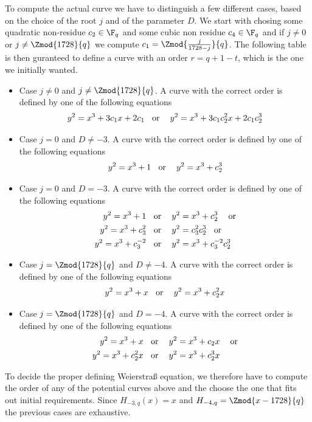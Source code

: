 To compute the actual curve we have to distinguish a few different cases, based on the choice of the root $j$ and of the parameter $D$. We start with chosing some quadratic non-residue $c_2\in \F_q$ and some cubic non residue $c_4\in \F_q$ and if $j\neq 0$ or $j\neq \Zmod{1728}{q}$ we compute $c_1=\Zmod{\frac{j}{1728 -j}}{q}$. The following table is then guranteed to define a curve with an order $r= q+1 -t$, which is the one we initially wanted.
\begin{itemize}
\item Case $j \neq 0 $ and $j\neq \Zmod{1728}{q}$. A curve with the correct order is defined by one of the following equations 
\begin{equation}
y^2 = x^3 + 3c_1x + 2c_1 \text{\;\; or \;\; } y^2 = x^3 + 3c_1c_2^2x + 2c_1c_2^3
\end{equation}
\item Case $j = 0 $ and $D\neq -3$. A curve with the correct order is defined by one of the following equations 
\begin{equation}
y^2 = x^3 + 1 \text{\;\; or \;\; } y^2 = x^3 + c_2^3
\end{equation}
\item Case $j = 0 $ and $D= -3$. A curve with the correct order is defined by one of the following equations 
\begin{align*}
y^2 = x^3 +1 & \text{\;\; or \;\; } y^2 = x^3 + c_2^3 \text{ \;\; or}\\  
y^2 = x^3 + c_3^2 & \text{\;\; or \;\; } y^2 = c_3^2 c_2^3 \text{\;\; or}\\
y^2 = x^3 + c_3^{-2} & \text{\;\; or \;\; }  y^2 = x^3 + c_3^{-2}c_2^3 
\end{align*}
\item Case $j = \Zmod{1728}{q} $ and $D\neq -4$. A curve with the correct order is defined by one of the following equations 
\begin{equation}
y^2 = x^3 + x \text{\;\; or \;\; } y^2 = x^3 + c_2^2x
\end{equation}
\item Case $j = \Zmod{1728}{q} $ and $D= -4$. A curve with the correct order is defined by one of the following equations 
\begin{align*}
y^2 = x^3 +x & \text{\;\; or \;\; } y^2 = x^3 + c_2x \text{ \;\; or}\\  
y^2 = x^3 + c_2^2x & \text{\;\; or \;\; } y^2 = x^3 + c_2^3x
\end{align*}
\end{itemize} 
To decide the proper defining Weierstraß equation, we therefore have to compute the order of any of the potential curves above and the choose the one that fits out initial requirements. Since $H_{-3,q}(x)=x$ and $H_{-4,q}= \Zmod{x-1728}{q}$ the previous cases are exhaustive.
